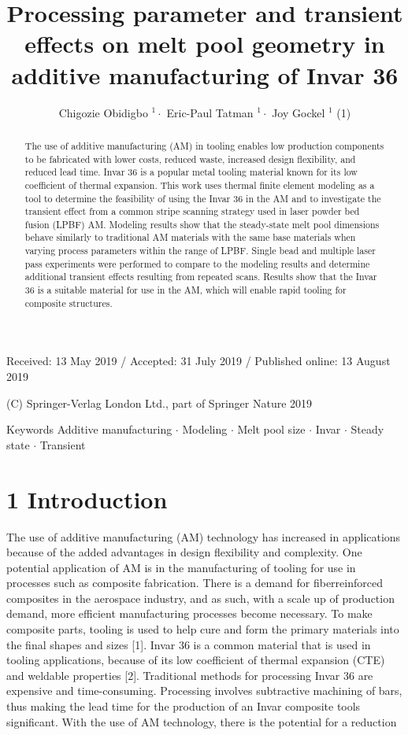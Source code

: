 \documentclass[10pt]{article}
\title{Processing parameter and transient effects on melt pool geometry in additive manufacturing of Invar 36 }
\author{Chigozie Obidigbo $^{1} \cdot$ Eric-Paul Tatman $^{1} \cdot$ Joy Gockel $^{1}$ (1)}
\date{}
\begin{document}
\maketitle
Received: 13 May 2019 / Accepted: 31 July 2019 / Published online: 13 August 2019

(C) Springer-Verlag London Ltd., part of Springer Nature 2019

\begin{abstract}
The use of additive manufacturing (AM) in tooling enables low production components to be fabricated with lower costs, reduced waste, increased design flexibility, and reduced lead time. Invar 36 is a popular metal tooling material known for its low coefficient of thermal expansion. This work uses thermal finite element modeling as a tool to determine the feasibility of using the Invar 36 in the AM and to investigate the transient effect from a common stripe scanning strategy used in laser powder bed fusion (LPBF) AM. Modeling results show that the steady-state melt pool dimensions behave similarly to traditional AM materials with the same base materials when varying process parameters within the range of LPBF. Single bead and multiple laser pass experiments were performed to compare to the modeling results and determine additional transient effects resulting from repeated scans. Results show that the Invar 36 is a suitable material for use in the AM, which will enable rapid tooling for composite structures.
\end{abstract}

Keywords Additive manufacturing $\cdot$ Modeling $\cdot$ Melt pool size $\cdot$ Invar $\cdot$ Steady state $\cdot$ Transient

\section*{1 Introduction}
The use of additive manufacturing (AM) technology has increased in applications because of the added advantages in design flexibility and complexity. One potential application of $\mathrm{AM}$ is in the manufacturing of tooling for use in processes such as composite fabrication. There is a demand for fiberreinforced composites in the aerospace industry, and as such, with a scale up of production demand, more efficient manufacturing processes become necessary. To make composite parts, tooling is used to help cure and form the primary materials into the final shapes and sizes [1]. Invar 36 is a common material that is used in tooling applications, because of its low coefficient of thermal expansion (CTE) and weldable properties [2]. Traditional methods for processing Invar 36 are expensive and time-consuming. Processing involves subtractive machining of bars, thus making the lead time for the production of an Invar composite tools significant. With the use of AM technology, there is the potential for a reduction
\end{document}
